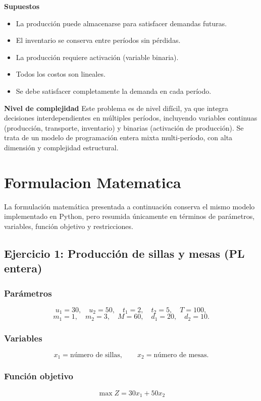 \documentclass[12pt,a4paper]{article}
\begin{document}
\textbf{Supuestos}
\begin{itemize}[leftmargin=*]
	\item La producción puede almacenarse para satisfacer demandas futuras.
	\item El inventario se conserva entre períodos sin pérdidas.
	\item La producción requiere activación (variable binaria).
	\item Todos los costos son lineales.
	\item Se debe satisfacer completamente la demanda en cada período.
\end{itemize}

\textbf{Nivel de complejidad} Este problema es de nivel difícil, ya que integra decisiones interdependientes en múltiples períodos, incluyendo variables continuas (producción, transporte, inventario) y binarias (activación de producción). Se trata de un modelo de programación entera mixta multi-período, con alta dimensión y complejidad estructural.

\section{Formulacion Matematica}

La formulación matemática presentada a continuación conserva el mismo modelo implementado en Python, pero resumida únicamente en términos de parámetros, variables, función objetivo y restricciones.

\subsection{Ejercicio 1: Producción de sillas y mesas (PL entera)}

\subsubsection*{Parámetros}
\[
u_1=30,\quad u_2=50,\quad t_1=2,\quad t_2=5,\quad T=100,
\]
\[
m_1=1,\quad m_2=3,\quad M=60,\quad d_1=20,\quad d_2=10.
\]

\subsubsection*{Variables}
\[
x_1=\text{número de sillas},\qquad x_2=\text{número de mesas}.
\]

\subsubsection*{Función objetivo}
\[
\max Z=30x_1+50x_2
\]
\end{document}
